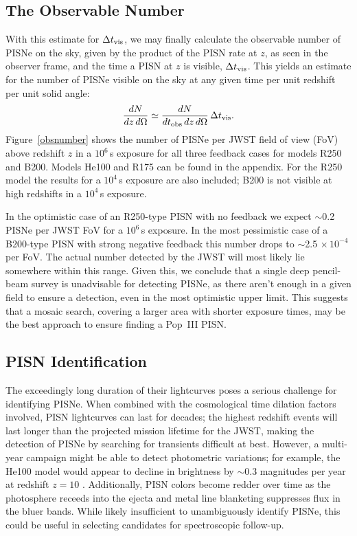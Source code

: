 \documentclass{thesis}
\newcommand{\about}{\ensuremath{\sim}}
\newcommand{\RefFig}[1]{\mbox{Figure~\ref{#1}}}
\begin{document}
\subsection{The Observable Number}
 With this estimate for $\Delta t_{\rm vis}$, we may finally calculate
 the observable number of PISNe on the sky, given by the product of
 the PISN rate at $z$, as seen in the observer frame, and the time a
 PISN at $z$ is visible, $\Delta t_{\rm vis}$. This yields an estimate
 for the number of PISNe visible on the sky at any given time per unit
 redshift per unit solid angle:
\begin{equation} 
\frac{dN}{dz\,d\Omega} \simeq \frac{dN}{dt_{\rm
    obs}\,dz\,d\Omega}\,\Delta t_{\rm vis}.
\end{equation}
\RefFig{obsnumber} shows the number of PISNe per JWST field of view
(FoV) above redshift $z$ in a $10^6\,$s exposure for all three
feedback cases for models R250 and B200. Models He100 and R175 can be
found in the appendix.  For the R250 model the results for a $10^4\,$s
exposure are also included; B200 is not visible at high redshifts in a
$10^4\,$s exposure.

In the optimistic case of an R250-type PISN with no feedback we expect
\about0.2 PISNe per JWST FoV for a $10^6\,$s exposure.  In the most
pessimistic case of a B200-type PISN with strong negative feedback
this number drops to \about2.5$\,\times10^{-4}$ per FoV.  The actual
number detected by the JWST will most likely lie somewhere within this
range. Given this, we conclude that a single deep pencil-beam survey
is unadvisable for detecting PISNe, as there aren't enough in a given
field to ensure a detection, even in the most optimistic upper limit.
This suggests that a mosaic search, covering a larger area with shorter
exposure times, may be the best approach to ensure finding a Pop~III
PISN.

\subsection{PISN Identification}
The exceedingly long duration of their lightcurves poses a serious
challenge for identifying PISNe.  When combined with the cosmological
time dilation factors involved, PISN lightcurves can last for decades;
the highest redshift events will last longer than the projected
mission lifetime for the JWST, making the detection of PISNe by
searching for transients difficult at best.  However, a multi-year
campaign might be able to detect photometric variations; for example,
the He100 model would appear to decline in brightness by \about0.3
magnitudes per year at redshift $z=10$
\citep{KasenWoosleyHeger2011}. Additionally, PISN colors become redder
over time as the photosphere receeds into the ejecta and metal line
blanketing suppresses flux in the bluer bands.  While likely
insufficient to unambiguously identify PISNe, this could be useful in
selecting candidates for spectroscopic follow-up.
\end{document}
